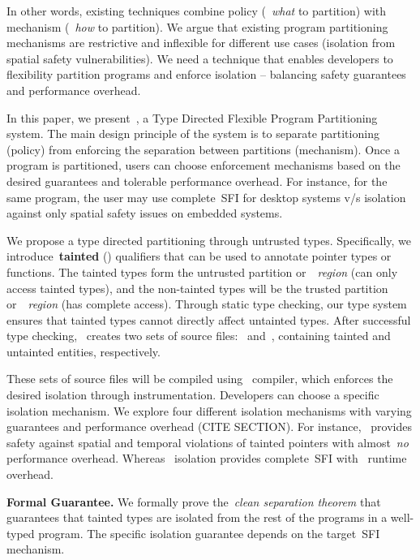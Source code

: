 In other words, existing techniques combine policy (\ie{}~\emph{what} to partition) with mechanism (\ie{}~\emph{how} to partition).
We argue that existing program partitioning mechanisms are restrictive and inflexible for different use cases (\eg isolation from spatial safety vulnerabilities). We need a technique that enables developers to flexibility partition programs and enforce isolation -- balancing safety guarantees and performance overhead.

In this paper, we present~\systemname{}, a Type Directed Flexible Program Partitioning system.
The main design principle of the system is to separate partitioning (\ie policy) from enforcing the separation between partitions (\ie mechanism).
Once a program is partitioned, users can choose enforcement mechanisms based on the desired guarantees and tolerable performance overhead. For instance, for the same program, the user may use complete~\ac{SFI} for desktop systems v/s isolation against only spatial safety issues on embedded systems.

We propose a type directed partitioning through untrusted types.
Specifically, we introduce~\textbf{tainted} (\taintt) qualifiers that can be used to annotate pointer types or functions. 
The tainted types form the untrusted partition or~\umode~\emph{region} (can only access tainted types), and the non-tainted types will be the trusted partition or~\cmode~\emph{region} (has complete access).
Through static type checking, our type system ensures that tainted types cannot directly affect untainted types.
After successful type checking,~\systemname{} creates two sets of source files:~\ucregion{} and~\cregion{}, containing tainted and untainted entities, respectively.

These sets of source files will be compiled using~\systemname{} compiler, which enforces the desired isolation through instrumentation.
Developers can choose a specific isolation mechanism.
We explore four different isolation mechanisms with varying guarantees and performance overhead (CITE SECTION).
For instance,~\isoheap{} provides safety against spatial and temporal violations of tainted pointers with almost~\emph{no} performance overhead.
Whereas~\sandbox{} isolation provides complete~\ac{SFI} with~\avgsandboxoverhead{} runtime overhead.

\noindent\textbf{Formal Guarantee.} We formally prove the~\emph{clean separation theorem} that guarantees that tainted types are isolated from the rest of the programs in a well-typed program.
The specific isolation guarantee depends on the target~\ac{SFI} mechanism.

